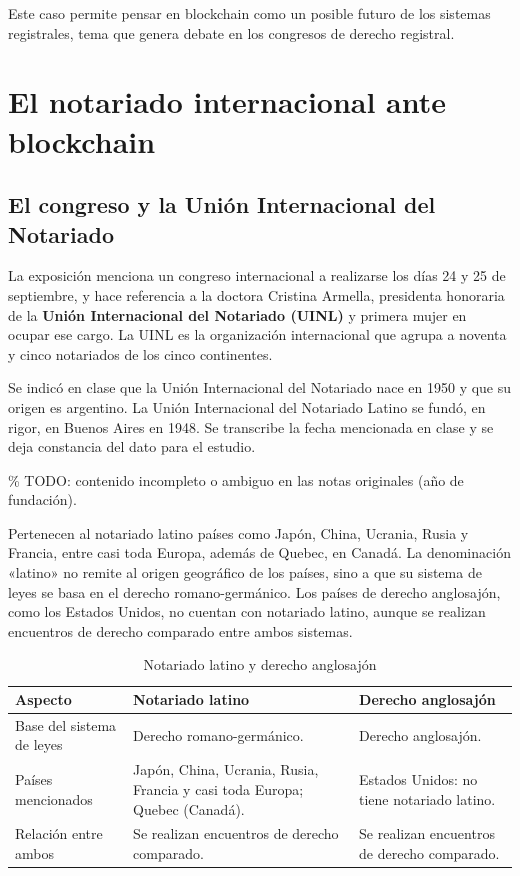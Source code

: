 \documentclass[12pt,oneside]{book}
\begin{document}
Este caso permite pensar en blockchain como un posible futuro de los sistemas registrales, tema que genera debate en los congresos de derecho registral.

\section{El notariado internacional ante blockchain}

\subsection{El congreso y la Unión Internacional del Notariado}

La exposición menciona un congreso internacional a realizarse los días 24 y 25 de septiembre, y hace referencia a la doctora Cristina Armella, presidenta honoraria de la \textbf{Unión Internacional del Notariado (UINL)} y primera mujer en ocupar ese cargo. La UINL es la organización internacional que agrupa a noventa y cinco notariados de los cinco continentes.

\begin{note}
Se indicó en clase que la Unión Internacional del Notariado nace en 1950 y que su origen es argentino. La Unión Internacional del Notariado Latino se fundó, en rigor, en Buenos Aires en 1948. Se transcribe la fecha mencionada en clase y se deja constancia del dato para el estudio.

\% TODO: contenido incompleto o ambiguo en las notas originales (año de fundación).
\end{note}

Pertenecen al notariado latino países como Japón, China, Ucrania, Rusia y Francia, entre casi toda Europa, además de Quebec, en Canadá. La denominación «latino» no remite al origen geográfico de los países, sino a que su sistema de leyes se basa en el derecho romano-germánico. Los países de derecho anglosajón, como los Estados Unidos, no cuentan con notariado latino, aunque se realizan encuentros de derecho comparado entre ambos sistemas.

\begin{table}[H]
\centering
\caption{Notariado latino y derecho anglosajón}
\begin{tabular}{p{}p{}p{}}
\toprule
\textbf{Aspecto} & \textbf{Notariado latino} & \textbf{Derecho anglosajón} \\
\midrule
Base del sistema de leyes & Derecho romano-germánico. & Derecho anglosajón. \\
Países mencionados & Japón, China, Ucrania, Rusia, Francia y casi toda Europa; Quebec (Canadá). & Estados Unidos: no tiene notariado latino. \\
Relación entre ambos & Se realizan encuentros de derecho comparado. & Se realizan encuentros de derecho comparado. \\
\bottomrule
\end{tabular}
\end{table}
\end{document}
